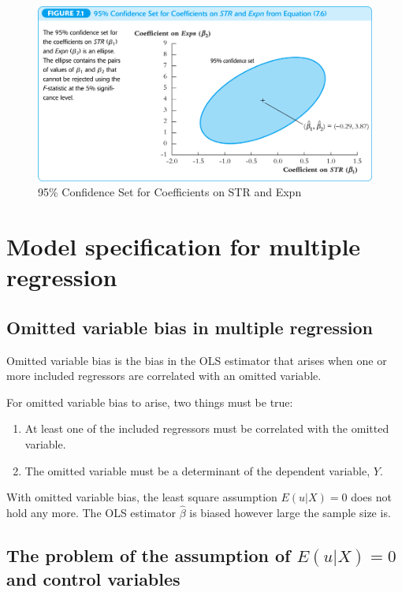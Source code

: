 \documentclass[a4paper,11pt]{article}
\begin{document}
\begin{figure}[htbp]
\centering
\includegraphics[width=.9\linewidth]{img/fig-7-1.png}
\caption{\label{fig:org24b6cab}
95\% Confidence Set for Coefficients on STR and Expn}
\end{figure}


\section{Model specification for multiple regression}
\label{sec:org108c6b0}

\subsection{Omitted variable bias in multiple regression}
\label{sec:org2415f05}

Omitted variable bias is the bias in the OLS estimator that arises
when one or more included regressors are correlated with an omitted
variable.

For omitted variable bias to arise, two things must be true:
\begin{enumerate}
\item At least one of the included regressors must be correlated with the
omitted variable.
\item The omitted variable must be a determinant of the dependent
variable, \(Y\).
\end{enumerate}

With omitted variable bias, the least square assumption \(E(u|X) = 0\)
does not hold any more. The OLS estimator \(\hat{\beta}\) is biased
however large the sample size is.


\subsection{The problem of the assumption of \(E(u|X) = 0\) and control variables}
\label{sec:orgcab33aa}
\end{document}
